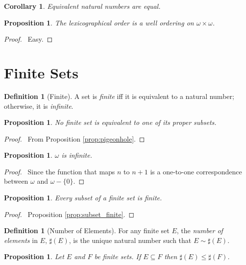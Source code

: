 \documentclass{report}
\let\qed\relax
\newtheorem{prop}[ax]{Proposition}
\newtheorem{cor}{Corollary}[ax]
\theoremstyle{definition}
\newtheorem{df}[ax]{Definition}
\begin{document}
\begin{cor}
Equivalent natural numbers are equal.
\end{cor}

\begin{prop}
The lexicographical order is a well ordering on $\omega \times \omega$.
\end{prop}

\begin{proof}
\pf\ Easy. \qed
\end{proof}

\section{Finite Sets}

\begin{df}[Finite]
A set is \emph{finite} iff it is equivalent to a natural number; otherwise, it is \emph{infinite}.
\end{df}

\begin{prop}
No finite set is equivalent to one of its proper subsets.
\end{prop}

\begin{proof}
\pf\ From Proposition \ref{prop:pigeonhole}. \qed
\end{proof}

\begin{prop}
$\omega$ is infinite.
\end{prop}

\begin{proof}
\pf\ Since the function that maps $n$ to $n+1$ is a one-to-one correspondence between $\omega$ and $\omega - \{0\}$. \qed
\end{proof}

\begin{prop}
Every subset of a finite set is finite.
\end{prop}

\begin{proof}
\pf\ Proposition \ref{prop:subset_finite}. \qed
\end{proof}

\begin{df}[Number of Elements]
For any finite set $E$, the \emph{number of elements} in $E$, $\sharp(E)$, is the unique natural number such that $E \sim \sharp(E)$.
\end{df}

\begin{prop}
Let $E$ and $F$ be finite sets. If $E \subseteq F$ then $\sharp(E) \leq \sharp(F)$.
\end{prop}
\end{document}
